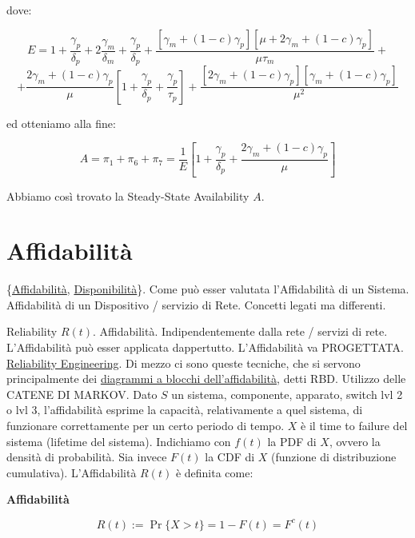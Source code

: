 dove:

\[
	E = 1 + \frac{\gamma_p}{\delta_p} + 2\frac{\gamma_m}{\delta_m} + \frac{\gamma_p}{\delta_p} + \frac{[\gamma_m + (1-c)\gamma_p][\mu+2\gamma_m + (1-c)\gamma_p]}{\mu\tau_m} +
\]
\[
	+ \frac{2\gamma_m + (1-c)\gamma_p}{\mu} [1+\frac{\gamma_p}{\delta_p} + \frac{\gamma_p}{\tau_p}] + \frac{[2\gamma_m + (1-c)\gamma_p][\gamma_m + (1-c)\gamma_p]}{\mu^2}
\]

ed otteniamo alla fine:

\[
	A = \pi_1 + \pi_6 + \pi_7 = \frac{1}{E} [1+\frac{\gamma_p}{\delta_p} + \frac{2\gamma_m + (1-c)\gamma_p}{\mu}]
\]

Abbiamo così trovato la Steady-State Availability $A$.

\section{Affidabilità}

\{\underline{Affidabilità}, \underline{Disponibilità}\}. Come può esser valutata l'Affidabilità di un Sistema. Affidabilità di un Dispositivo / servizio di Rete. Concetti legati ma differenti.

Reliability $R(t)$. Affidabilità. Indipendentemente dalla rete / servizi di rete. L'Affidabilità può esser applicata dappertutto. L'Affidabilità va PROGETTATA. \underline{Reliability Engineering}. Di mezzo ci sono queste tecniche, che si servono principalmente dei \newline \underline{diagrammi a blocchi dell'affidabilità}, detti RBD. Utilizzo delle CATENE DI MARKOV. Dato $\mathit{S}$ un sistema, componente, apparato, switch lvl 2 o lvl 3, l'affidabilità esprime la capacità, relativamente a quel sistema, di funzionare correttamente per un certo periodo di tempo. $X$ è il time to failure del sistema (lifetime del sistema). Indichiamo con $f(t)$ la PDF di $X$, ovvero la densità di probabilità. Sia invece $F(t)$ la CDF di $X$ (funzione di distribuzione cumulativa). L'Affidabilità $R(t)$ è definita come:

\begin{defn}{\textbf{Affidabilità}}

\[
	R(t) := \Pr\{X > t\} = 1-F(t) = F^c(t)
\]

\end{defn}

